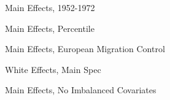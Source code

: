 \documentclass{article}
\begin{document}
\begin{table}[htbp]\centering {}  \begin{threeparttable} \caption{Main Effects, 1952-1972}
\footnotesize

\end{threeparttable}  \end{table}
\clearpage

\begin{table}[htbp]\centering {}  \begin{threeparttable} \caption{Main Effects, Percentile}
\footnotesize

\end{threeparttable}  \end{table}
\clearpage


%


\begin{table}[htbp]\centering {}  \begin{threeparttable} \caption{Main Effects, European Migration Control}
\footnotesize

\end{threeparttable}  \end{table}
\clearpage


\begin{table}[htbp]\centering {}  \begin{threeparttable} \caption{White Effects, Main Spec}
\footnotesize

\end{threeparttable}  \end{table}
\clearpage



\begin{table}[htbp]\centering {}  \begin{threeparttable} \caption{Main Effects, No Imbalanced Covariates}
\footnotesize

\end{threeparttable}  \end{table}
\clearpage
\end{document}

